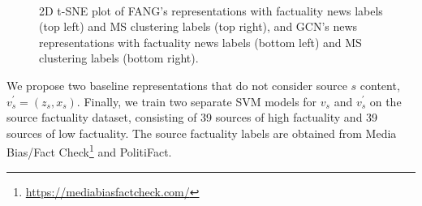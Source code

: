 \documentclass[sigconf,anonymous]{acmart}
\theoremstyle{definition}
\theoremstyle{hypothesis}
\begin{document}
\begin{figure}[t]
\\
\caption{2D t-SNE plot of FANG's representations with factuality news labels (top left) and MS clustering labels (top right), and GCN's news representations with factuality news labels (bottom left) and MS clustering labels (bottom right).}
\label{fig:fang_rep}
\end{figure}

We propose two baseline representations that do not consider source $s$ content, $v^{\prime}_s=(z_s,x_s)$. Finally, we train two separate SVM models for $v_s$ and $v^{\prime}_s$ on the source factuality dataset, consisting of 39 sources of high factuality and 39 sources of low factuality. 
The source factuality labels are obtained from Media Bias/Fact Check\footnote{\url{https://mediabiasfactcheck.com/}} and PolitiFact.

\end{document}
